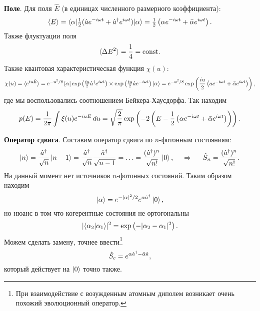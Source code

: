 \textbf{Поле}. Для поля $\hat{E}$ (в единицах численного размерного коэффициента):
\begin{equation*}
    \langle E\rangle  = \bk{\alpha}[ \tfrac{1}{2}(\hat{a} e^{- i \omega t} + \hat{a}\D e^{i \omega t})]{\alpha} = \tfrac{1}{2}\left(\alpha e^{- i \omega t} + \bar{\alpha} e^{i \omega t}\right).
\end{equation*}
Также флуктуации поля
\begin{equation*}
    \langle \Delta E^2\rangle = \frac{1}{4} = \textnormal{const}.
\end{equation*}
Также квантовая характеристическая функция $\chi(u)$:
\begin{equation*}
    \chi(u) = \langle e^{i u \hat{E}}\rangle = e^{- u^2/8} \bk{\alpha}[\exp\left( \tfrac{i u}{2} \hat{a}\D e^{i \omega t}\right) \times \exp\left(
        \tfrac{i u}{2} \hat{a} e^{- i \omega t}
    \right)]{\alpha} = 
    e^{-u^2/8} \exp\left(
        \frac{iu}{2} \left(a e^{- i \omega t} + \bar{\alpha} e^{i\omega t}\right)
    \right)
    ,
\end{equation*}
где мы воспользовались соотношением Бейкера-Хаусдорфа. Так находим
\begin{equation*}
    p(E) = \frac{1}{2\pi} \int \xi(u) e^{-i u E} \, d u = \sqrt{\frac{2}{\pi}} \exp\left(
        - 2 \left(E - \frac{1}{2}\left(\alpha e^{- i \omega t} + \bar{\alpha} e^{i \omega t}\right)\right)
    \right).
\end{equation*}




\textbf{Оператор сдвига}. Составим оператор сдвига по $n$-фотонным состояниям:
\begin{equation*}
    \left| n \right\rangle = \frac{\hat{a}^\dagger}{\sqrt{n}} \left| n-1 \right\rangle = \frac{\hat{a}^\dagger}{\sqrt{n}} \frac{\hat{a}^\dagger}{\sqrt{n-1}} = \ldots = \frac{(\hat{a}^\dagger)^n}{\sqrt{n!}} \left| 0 \right\rangle,
    \hspace{0.5cm} \Rightarrow \hspace{0.5cm}
    \hat{S}_n = \frac{(\hat{a}^\dagger)^n}{\sqrt{n!}}.
\end{equation*}
На данный момент нет источников $n$-фотонных состояний.
Таким образом находим
\begin{equation*}
    \left| \alpha \right\rangle = e^{-|\alpha|^2/2} e^{\alpha \hat{a}^\dagger} \left| 0 \right\rangle,
\end{equation*}
но нюанс в том что когерентные состояния не ортогональны
\begin{equation*}
    |\bk{\alpha_2}{\alpha_1}|^2 = \exp\left(-|\alpha_2-\alpha_1|^2\right).
\end{equation*}
Можем сделать замену, точнее ввести\footnote{
    При взаимодействие с возужденным атомным диполем возникает очень похожий эволюционный оператор.
} 
\begin{equation*}
    \hat{S}_c = e^{\alpha \hat{a}^\dagger - \bar{\alpha} \hat{a}},
\end{equation*}
который действует на $\left| 0 \right\rangle$ точно также.



